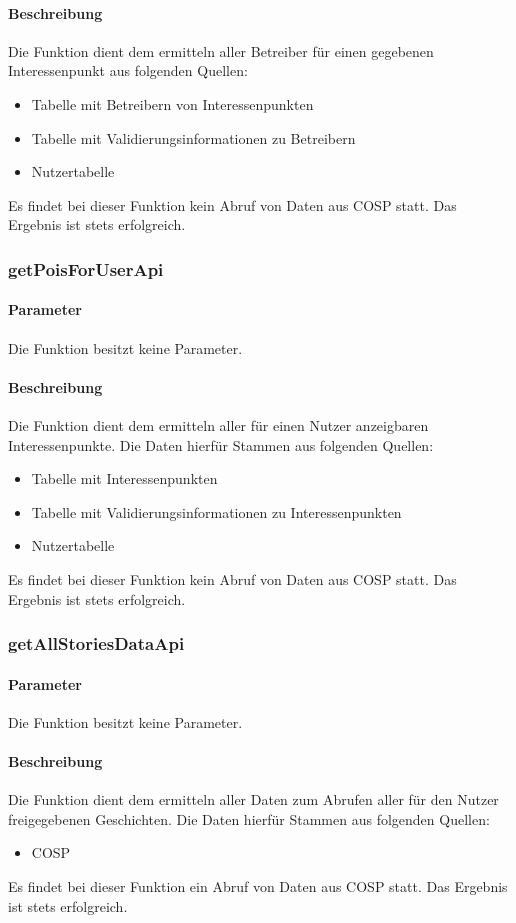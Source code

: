 \paragraph{Beschreibung} Die Funktion dient dem ermitteln aller Betreiber für einen gegebenen Interessenpunkt aus folgenden Quellen:
\begin{itemize}
	\item Tabelle mit Betreibern von Interessenpunkten
	\item Tabelle mit Validierungsinformationen zu Betreibern
	\item Nutzertabelle
\end{itemize}
Es findet bei dieser Funktion kein Abruf von Daten aus {\glqq COSP\grqq} statt. Das Ergebnis ist stets erfolgreich.
\subsubsection{getPoisForUserApi}
\paragraph{Parameter} Die Funktion besitzt keine Parameter.
\paragraph{Beschreibung} Die Funktion dient dem ermitteln aller für einen Nutzer anzeigbaren Interessenpunkte. Die Daten hierfür Stammen aus folgenden Quellen:
\begin{itemize}
	\item Tabelle mit Interessenpunkten
	\item Tabelle mit Validierungsinformationen zu Interessenpunkten
	\item Nutzertabelle
\end{itemize}
Es findet bei dieser Funktion kein Abruf von Daten aus {\glqq COSP\grqq} statt. Das Ergebnis ist stets erfolgreich.
\subsubsection{getAllStoriesDataApi}
\paragraph{Parameter} Die Funktion besitzt keine Parameter.
\paragraph{Beschreibung} Die Funktion dient dem ermitteln aller Daten zum Abrufen aller für den Nutzer freigegebenen Geschichten. Die Daten hierfür Stammen aus folgenden Quellen:
\begin{itemize}
	\item COSP
\end{itemize}
Es findet bei dieser Funktion ein Abruf von Daten aus {\glqq COSP\grqq} statt. Das Ergebnis ist stets erfolgreich.
